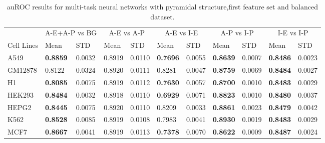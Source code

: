 \begin{table}[!htbp]
\centering
\caption{auROC results for multi-task neural networks with pyramidal structure,first feature set and balanced dataset.}
\label{tab:pyramidal_auroc}
\hspace*{-2.2cm}
\begin{tabular}[t]{*{11}{l}}
\toprule
 & \multicolumn{2}{c}{A-E+A-P vs BG} & \multicolumn{2}{c}{A-E vs A-P} & \multicolumn{2}{c}{A-E vs I-E} & \multicolumn{2}{c}{A-P vs I-P} & \multicolumn{2}{c}{I-E vs I-P} \\
\cmidrule(lr){2-3}
\cmidrule(lr){4-5}
\cmidrule(lr){6-7}
\cmidrule(lr){8-9}
\cmidrule(lr){10-11}
Cell Lines & Mean & STD & Mean & STD & Mean & STD & Mean & STD & Mean & STD \\
\midrule
A549  & \textbf{0.8859} & 0.0032 & 0.8919 & 0.0110 & \textbf{0.7696} & 0.0055 & \textbf{0.8639} & 0.0007 & \textbf{0.8486} & 0.0023\\
GM12878  & 0.8122 & 0.0324 & 0.8920 & 0.0111 & 0.8281 & 0.0047 & \textbf{0.8759} & 0.0069 & \textbf{0.8484} & 0.0027\\
H1  & \textbf{0.8085} & 0.0075 & 0.8919 & 0.0112 & \textbf{0.7630} & 0.0057 & \textbf{0.8700} & 0.0010 & \textbf{0.8483} & 0.0029\\
HEK293  & \textbf{0.8484} & 0.0032 & 0.8918 & 0.0110 & \textbf{0.6929} & 0.0071 & \textbf{0.8823} & 0.0010 & \textbf{0.8480} & 0.0037\\
HEPG2  & \textbf{0.8445} & 0.0075 & 0.8920 & 0.0110 & 0.8209 & 0.0033 & \textbf{0.8861} & 0.0023 & \textbf{0.8479} & 0.0042\\
K562  & \textbf{0.8528} & 0.0085 & 0.8919 & 0.0108 & 0.7983 & 0.0041 & \textbf{0.8930} & 0.0019 & \textbf{0.8483} & 0.0029\\
MCF7  & \textbf{0.8667} & 0.0041 & 0.8919 & 0.0113 & \textbf{0.7378} & 0.0070 & \textbf{0.8622} & 0.0009 & \textbf{0.8487} & 0.0024\\
\bottomrule
\end{tabular}
\hspace*{-2.2cm}
\end{table}
